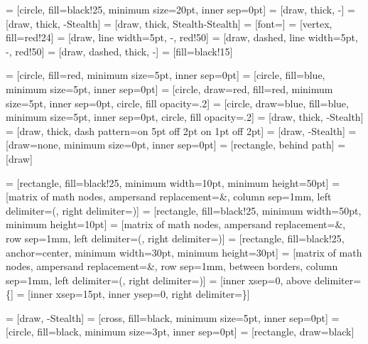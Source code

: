 \usepackage{tikz}
\usetikzlibrary{spy, arrows, arrows.meta, calc, decorations.pathmorphing, decorations.pathreplacing, fit, matrix, patterns, shapes, shapes.multipart, shapes.misc, positioning}
\usepackage{pgfplots}
\usepackage{caption}       %
\usepackage{subcaption}    %


 = [circle, fill=black!25, minimum size=20pt, inner sep=0pt]
 = [draw, thick, -]
 = [draw, thick, -Stealth]
 = [draw, thick, Stealth-Stealth]
 = [font=\small]
 = [vertex, fill=red!24]
 = [draw, line width=5pt, -, red!50]
 = [draw, dashed, line width=5pt, -, red!50]
 = [draw, dashed, thick, -]
 = [fill=black!15]

 = [circle, fill=red, minimum size=5pt, inner sep=0pt]
 = [circle, fill=blue, minimum size=5pt, inner sep=0pt]
 = [circle, draw=red, fill=red, minimum size=5pt, inner sep=0pt, circle, fill opacity=.2]
 = [circle, draw=blue, fill=blue, minimum size=5pt, inner sep=0pt, circle, fill opacity=.2]
 = [draw, thick, -Stealth]
 = [draw, thick, dash pattern=on 5pt off 2pt on 1pt off 2pt]
 = [draw, -Stealth]
 = [draw=none, minimum size=0pt, inner sep=0pt]
 = [rectangle, behind path]
 = [draw]

 = [rectangle, fill=black!25, minimum width=10pt, minimum height=50pt]
 = [matrix of math nodes, ampersand replacement=\&, column sep=1mm, left delimiter=(, right delimiter=)]
 = [rectangle, fill=black!25, minimum width=50pt, minimum height=10pt]
 = [matrix of math nodes, ampersand replacement=\&, row sep=1mm, left delimiter=(, right delimiter=)]
 = [rectangle, fill=black!25, anchor=center, minimum width=30pt, minimum height=30pt]
 = [matrix of math nodes, ampersand replacement=\&, row sep={1mm, between borders}, column sep=1mm, left delimiter=(, right delimiter=)]
 = [inner xsep=0, above delimiter=\{]
 = [inner xsep=15pt, inner ysep=0, right delimiter=\}]

 = [draw, -Stealth]
 = [cross, fill=black, minimum size=5pt, inner sep=0pt]
 = [circle, fill=black, minimum size=3pt, inner sep=0pt]
 = [rectangle, draw=black]

\pgfplotsset{compat=1.18}
